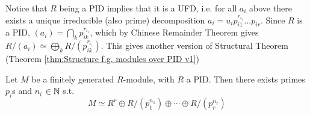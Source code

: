 \begin{remark}
    Notice that $R$ being a PID implies that it is a UFD, i.e. for all $a_i$ above there exists a unique irreducible (also prime) decomposition $a_i = u_i p_{i1}^{r_{i_1}} \ldots p_{ir}$. Since $R$ is a PID, $(a_i) = \bigcap_k p_{ik}^{r_{i_1}}$, which by Chinese Remainder Theorem gives $R/(a_i) \simeq \bigoplus_k R/(p_{ik}^{r_{i_1}})$. This gives another version of Structural Theorem (Theorem \ref{thm:Structure f.g. modules over PID v1})
\end{remark}

\begin{theorem}[Structure, v2]\label{thm:Structure f.g. modules over PID v2}
    Let $M$ be a finitely generated $R$-module, with $R$ a PID. Then there exists primes $p_i$s and $n_i$ $\in \mathbb{N}$ s.t. 
    \[
        M \simeq R^r \oplus R/(p_1^{n_1}) \oplus \cdots \oplus R/(p_r^{n_r})
    \]
\end{theorem}